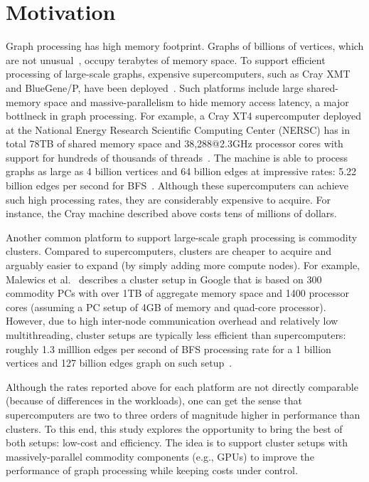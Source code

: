 \section{Motivation}
\label{sec:motivation}

Graph processing has high memory footprint. Graphs of billions of vertices, which are not unusual~\cite{graph500}, occupy terabytes of memory space. To support efficient processing of large-scale graphs, expensive supercomputers, such as Cray XMT and BlueGene/P, have been deployed~\cite{mizell2009early, yoo2005scalable}. Such platforms include large shared-memory space and massive-parallelism to hide memory access latency, a major bottlneck in graph processing. For example, a Cray XT4 supercomputer deployed at the National Energy Research Scientific Computing Center (NERSC) has in total 78TB of shared memory space and 38,288@2.3GHz processor cores with support for hundreds of thousands of threads~\cite{franklin2011cray}. The machine is able to process graphs as large as 4 billion vertices and 64 billion edges at impressive rates: 5.22 billion edges per second for BFS~\cite{graph500}. Although these supercomputers can achieve such high processing rates, they are considerably expensive to acquire. For instance, the Cray machine described above costs tens of millions of dollars.

Another common platform to support large-scale graph processing is commodity clusters. Compared to supercomputers, clusters are cheaper to acquire and arguably easier to expand (by simply adding more compute nodes). For example, Malewics et al.~\cite{Malewicz2009} describes a cluster setup in Google that is based on 300 commodity PCs with over 1TB of aggregate memory space and 1400 processor cores (assuming a PC setup of 4GB of memory and quad-core processor). However, due to high inter-node communication overhead and relatively low multithreading, cluster setups are typically less efficient than supercomputers: roughly 1.3 milllion edges per second of BFS processing rate for a 1 billion vertices and 127 billion edges graph on such setup~\cite{Malewicz2009}.

Although the rates reported above for each platform are not directly comparable (because of differences in the workloads), one can get the sense that supercomputers are two to three orders of magnitude higher in performance than clusters. To this end, this study explores the opportunity to bring the best of both setups: low-cost and efficiency. The idea is to support cluster setups with massively-parallel commodity components (e.g., GPUs) to improve the performance of graph processing while keeping costs under control.
